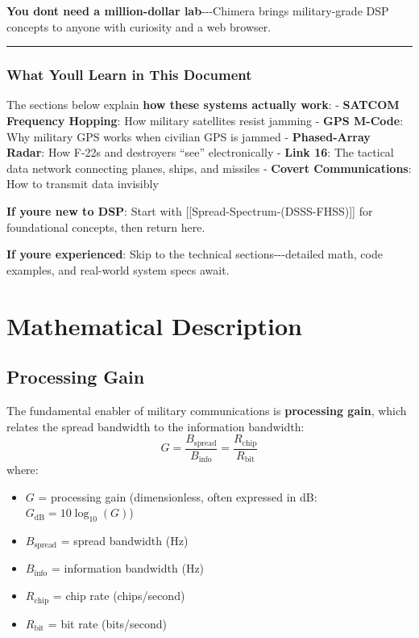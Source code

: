 \textbf{You don\textquotesingle t need a million-dollar
lab}-\/-\/-Chimera brings military-grade DSP concepts to anyone with
curiosity and a web browser.

\begin{center}\rule{0.5\linewidth}{0.5pt}\end{center}

\subsubsection{What You\textquotesingle ll Learn in This
Document}\label{what-youll-learn-in-this-document}

The sections below explain \textbf{how these systems actually work}: -
\textbf{SATCOM Frequency Hopping}: How military satellites resist
jamming - \textbf{GPS M-Code}: Why military GPS works when civilian GPS
is jammed - \textbf{Phased-Array Radar}: How F-22s and destroyers
``see'' electronically - \textbf{Link 16}: The tactical data network
connecting planes, ships, and missiles - \textbf{Covert Communications}:
How to transmit data invisibly

\textbf{If you\textquotesingle re new to DSP}: Start with
{[}{[}Spread-Spectrum-(DSSS-FHSS){]}{]} for foundational concepts, then
return here.

\textbf{If you\textquotesingle re experienced}: Skip to the technical
sections-\/-\/-detailed math, code examples, and real-world system specs
await.

\section{Mathematical Description}

\subsection{Processing Gain}

The fundamental enabler of military communications is \textbf{processing gain}, which relates the spread bandwidth to the information bandwidth:
\begin{equation}
G = \frac{B_{\text{spread}}}{B_{\text{info}}} = \frac{R_{\text{chip}}}{R_{\text{bit}}}
\label{eq:processing-gain}
\end{equation}
where:
\begin{itemize}
\item $G$ = processing gain (dimensionless, often expressed in dB: $G_{\text{dB}} = 10\log_{10}(G)$)
\item $B_{\text{spread}}$ = spread bandwidth (Hz)
\item $B_{\text{info}}$ = information bandwidth (Hz)
\item $R_{\text{chip}}$ = chip rate (chips/second)
\item $R_{\text{bit}}$ = bit rate (bits/second)
\end{itemize}

